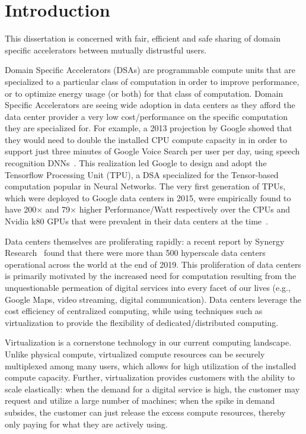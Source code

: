 \chapter{Introduction}
\label{sec:intro}

This dissertation is concerned with fair, efficient and safe sharing of
domain specific accelerators between mutually distrustful users.

Domain Specific Accelerators (DSAs) are programmable compute units that are
specialized to a particular class of computation in order to improve
performance, or to optimize energy usage (or both) for that class of
computation.
Domain Specific Accelerators are seeing wide adoption in  data centers as they afford
the data center provider a very low cost/performance on the specific
computation they are specialized for. For example, a 2013 projection by Google
showed that they would need to double the installed CPU compute capacity in
in order to support just three minutes of Google Voice Search per user per
day, using speech recognition DNNs~\cite{TPU-CACM}.
This realization led Google to design and adopt the Tensorflow Processing
Unit (TPU), a DSA specialized for the Tensor-based computation popular in
Neural Networks. The very first generation of TPUs, which were deployed to
Google data centers in 2015, were empirically found to have 200$\times$ and
79$\times$ higher Performance/Watt respectively over the CPUs and Nvidia k80
GPUs that were prevalent in their data centers at the time~\cite{TPU-ISCA}.

Data centers themselves are proliferating rapidly: a recent report by
Synergy Research~\cite{datacentergrowth-src} found that there were more than
500 hyperscale data centers operational across the world at the end of 2019.
This proliferation of data centers is primarily motivated by the increased
need for computation resulting from the unquestionable permeation of digital
services into every facet of our lives (e.g., Google Maps, video streaming,
digital communication). Data centers leverage the cost efficiency of
centralized computing, while using techniques such as virtualization to
provide the flexibility of dedicated/distributed computing.

Virtualization is a cornerstone technology in our current computing landscape.
Unlike physical compute, virtualized compute resources can be securely
multiplexed among many users, which allows for high utilization of the
installed compute capacity. Further, virtualization provides customers with
the ability to scale elastically: when the demand for a digital service is
high, the customer may request and utilize a large number of machines; when
the spike in demand subsides, the customer can just release the excess compute
resources, thereby only paying for what they are actively using.

